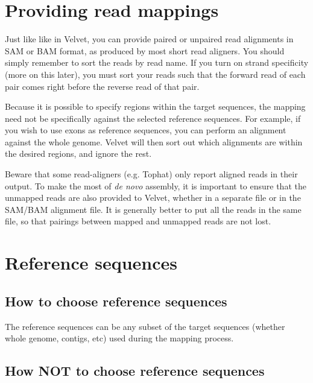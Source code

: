 \documentclass[12pt]{article}
\begin{document}
\section{Providing read mappings}

Just like like in Velvet, you can provide paired or unpaired read alignments in SAM or BAM format, as produced by most short read aligners. You
should simply remember to sort the reads by read name. If you turn on strand specificity (more on this later), you must sort your reads
such that the forward read of each pair comes right before the reverse read of that pair.

Because it is possible to specify regions within the target sequences, the mapping need not be specifically against the selected reference sequences.
For example, if you wish to use exons as reference sequences, you can perform an alignment against the whole genome. Velvet will then sort out which
alignments are within the desired regions, and ignore the rest.

Beware that some read-aligners (e.g. Tophat) only report aligned reads in their output. To make the most of \emph{de novo} assembly, it is important to ensure that the unmapped reads are also provided to Velvet, whether in a separate file or in the SAM/BAM alignment file. It is generally better to put all the reads in the same file, so that pairings between mapped and unmapped reads are not lost.

\section{Reference sequences}

\subsection{How to choose reference sequences}

The reference sequences can be any subset of the target sequences (whether whole genome, contigs, etc) used during the mapping process.

\subsection{How \textbf{NOT} to choose reference sequences}
\end{document}
